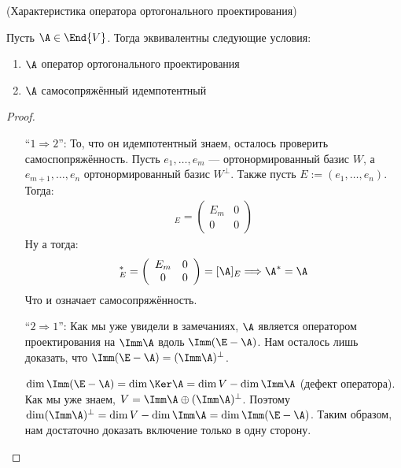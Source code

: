 \begin{theorem} (Характеристика оператора ортогонального проектирования)

    Пусть $\A \in \End{V}$. 
    Тогда эквивалентны следующие условия:
    \begin{enumerate}
        \item $\A$ оператор ортогонального проектирования
        \item $\A$ самосопряжённый идемпотентный
    \end{enumerate}

    \begin{proof} \quad 
    
    \begin{itemize}
        \item[``$1 \Rightarrow 2$'':]
            То, что он идемпотентный знаем, осталось проверить самоспопряжённость. 
            Пусть $e_1, \dots, e_m$ --- ортонормированный базис $W$, а $e_{m + 1}, \dots, e_n$ ортонормированный базис $W^{\perp}$.
            Также пусть $E := (e_1, \dots, e_n)$. Тогда:
            \begin{gather*}
                [\A]_E = \left(\begin{array}{cc}
                E_m & 0 \\ 
                0 & 0
                \end{array}\right)
            \end{gather*}
            Ну а тогда:    
            \begin{gather*}
                [\A]^*_E = \left(\begin{array}{cc}
                E_m & 0 \\ 
                0 & 0
                \end{array}\right) = [\A]_E \Longrightarrow \A^* = \A
            \end{gather*}
            Что и означает самосопряжённость.
        \item[``$2 \Rightarrow 1$'':]  
            Как мы уже увидели в замечаниях, $\A$ является оператором проектирования на $\Imm \A$ вдоль $\Imm (\E - \A)$. Нам осталось лишь доказать, что $\Imm (\E - \A) = (\Imm \A)^\perp$. 

            $\dim \Imm (\E - \A) = \dim \Ker \A = \dim V - \dim \Imm \A$ (дефект оператора). Как мы уже знаем, $V = \Imm \A \oplus (\Imm \A)^\perp$. Поэтому $\dim (\Imm \A)^\perp = \dim V - \dim \Imm \A = \dim \Imm (\E - \A)$. Таким образом, нам достаточно доказать включение только в одну сторону.


\end{itemize}
\end{proof}
\end{theorem}
